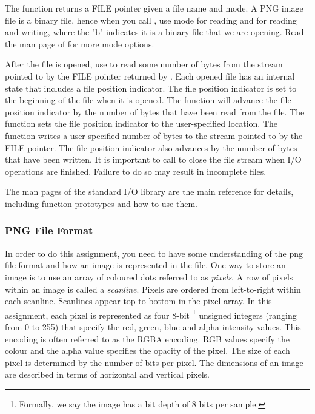 The  function returns a FILE pointer given a file name and mode. A PNG image file is a binary file, hence when you call , use mode  for reading and  for reading and writing, where the "b" indicates it is a binary file that we are opening. Read the man page of  for more mode options. 

After the file is opened, use  to read some number of bytes from the stream pointed to by the FILE pointer returned by . Each opened file has an internal state that includes a file position indicator. The file position indicator is set to the beginning of the file when it is opened. The  function will advance the file position indicator by the number of bytes that have been read from the file. The  function sets the file position indicator to the user-specified location. The  function writes a user-specified number of bytes to the stream pointed to by the FILE pointer. The file position indicator also advances by the number of bytes that have been written. It is important to call  to close the file stream when I/O operations are finished. Failure to do so may result in incomplete files.  

The man pages of the standard I/O library are the main reference for details, including function prototypes and how to use them.   

\subsubsection{PNG File Format}
\label{subsec_PNG_File_Format}
In order to do this assignment, you need to have some understanding of the png file format and how an image is represented in the file. One way to store an image is to use an array of coloured dots referred to as {\em pixels}. A row of pixels within an image is called a {\em scanline}. Pixels are ordered from left-to-right within each scanline. Scanlines appear top-to-bottom in the pixel array. In this assignment, each pixel is represented as four 8-bit
\footnote{Formally, we say the image has a bit depth of 8 bits per sample.}
unsigned integers (ranging from 0 to 255) that specify the red, green, blue and alpha intensity values. This encoding is often referred to as the RGBA encoding. RGB values specify the colour and the alpha value specifies the opacity of the pixel. The size of each pixel is determined by the number of bits per pixel. The dimensions of an image are described in terms of horizontal and vertical pixels. 

